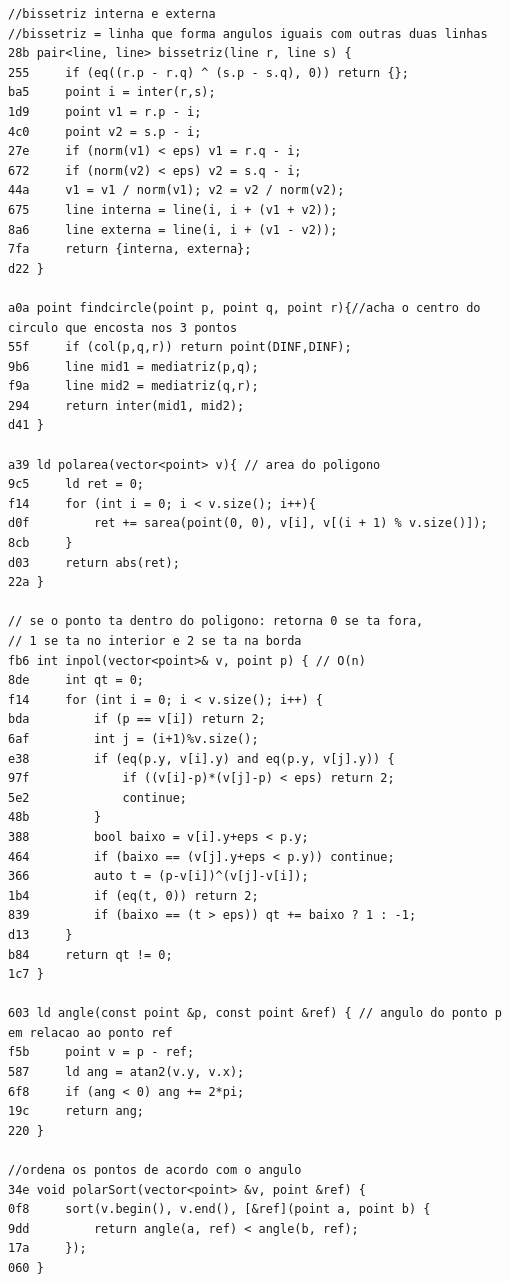 \documentclass[11pt, a4paper, twoside]{article}
\begin{document}
\begin{lstlisting}
//bissetriz interna e externa
//bissetriz = linha que forma angulos iguais com outras duas linhas
28b pair<line, line> bissetriz(line r, line s) {
255     if (eq((r.p - r.q) ^ (s.p - s.q), 0)) return {};
ba5 	point i = inter(r,s);
1d9 	point v1 = r.p - i;
4c0     point v2 = s.p - i;
27e 	if (norm(v1) < eps) v1 = r.q - i;
672     if (norm(v2) < eps) v2 = s.q - i;
44a     v1 = v1 / norm(v1); v2 = v2 / norm(v2);
675     line interna = line(i, i + (v1 + v2));
8a6     line externa = line(i, i + (v1 - v2));
7fa     return {interna, externa};
d22 }

a0a point findcircle(point p, point q, point r){//acha o centro do circulo que encosta nos 3 pontos
55f 	if (col(p,q,r)) return point(DINF,DINF);
9b6 	line mid1 = mediatriz(p,q);
f9a 	line mid2 = mediatriz(q,r);
294 	return inter(mid1, mid2);
d41 }

a39 ld polarea(vector<point> v){ // area do poligono
9c5 	ld ret = 0;
f14 	for (int i = 0; i < v.size(); i++){
d0f 		ret += sarea(point(0, 0), v[i], v[(i + 1) % v.size()]);
8cb 	}	
d03 	return abs(ret);
22a }

// se o ponto ta dentro do poligono: retorna 0 se ta fora,
// 1 se ta no interior e 2 se ta na borda
fb6 int inpol(vector<point>& v, point p) { // O(n)
8de 	int qt = 0;
f14 	for (int i = 0; i < v.size(); i++) {
bda 		if (p == v[i]) return 2;
6af 		int j = (i+1)%v.size();
e38 		if (eq(p.y, v[i].y) and eq(p.y, v[j].y)) {
97f 			if ((v[i]-p)*(v[j]-p) < eps) return 2;
5e2 			continue;
48b 		}
388 		bool baixo = v[i].y+eps < p.y;
464 		if (baixo == (v[j].y+eps < p.y)) continue;
366 		auto t = (p-v[i])^(v[j]-v[i]);
1b4 		if (eq(t, 0)) return 2;
839 		if (baixo == (t > eps)) qt += baixo ? 1 : -1;
d13 	}
b84 	return qt != 0;
1c7 }

603 ld angle(const point &p, const point &ref) { // angulo do ponto p em relacao ao ponto ref
f5b     point v = p - ref;
587     ld ang = atan2(v.y, v.x);
6f8     if (ang < 0) ang += 2*pi;
19c     return ang;
220 }

//ordena os pontos de acordo com o angulo
34e void polarSort(vector<point> &v, point &ref) {
0f8     sort(v.begin(), v.end(), [&ref](point a, point b) { 
9dd         return angle(a, ref) < angle(b, ref);
17a     });
060 }
\end{lstlisting}
\end{document}
